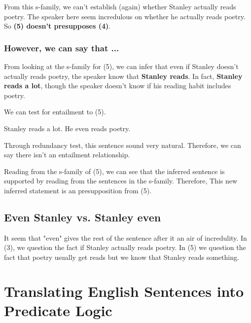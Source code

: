 \documentclass{article}
\begin{document}
From this s-family, we can't establish (again) whether Stanley actually reads poetry. The speaker here seem incredulous on whether he actually reads poetry. So \textbf{(5) doesn't presupposes (4)}.

\subsubsection{However, we can say that ...}
From looking at the s-family for (5), we can infer that even if Stanley doesn't actually reads poetry, the speaker know that \textbf{Stanley reads}. In fact, \textbf{Stanley reads a lot}, though the speaker doesn't know if his reading habit includes poetry. 

We can test for entailment to (5). 

Stanley reads a lot. He even reads poetry. 

Through redundancy test, this sentence sound very natural. Therefore, we can say there isn't an entailment relationship. 

Reading from the s-family of (5), we can see that the inferred sentence is supported by reading from the sentences in the s-family. Therefore, This new inferred statement is an presupposition from (5). 

\subsection{Even Stanley vs. Stanley even}
It seem that "even" gives the rest of the sentence after it an air of incredulity. In (3), we question the fact if Stanley actually reads poetry. In (5) we question the fact that poetry usually get reads but we know that Stanley reads something. 

\section{Translating English Sentences into Predicate Logic}
\end{document}
